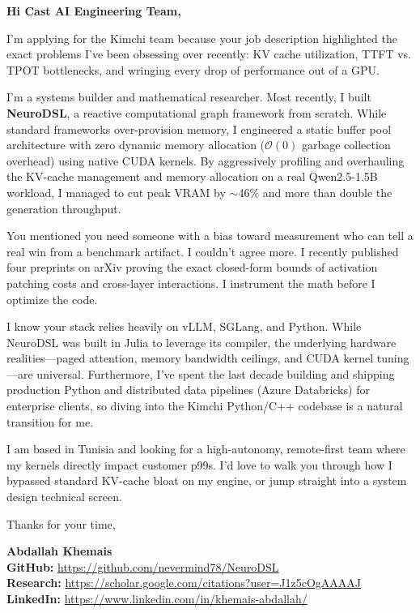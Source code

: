 \documentclass[11pt,a4paper]{article}
\begin{document}
\thispagestyle{empty} 

\textbf{Hi Cast AI Engineering Team,}

I’m applying for the Kimchi team because your job description highlighted the exact problems I’ve been obsessing over recently: KV cache utilization, TTFT vs. TPOT bottlenecks, and wringing every drop of performance out of a GPU. 

I’m a systems builder and mathematical researcher. Most recently, I built \textbf{NeuroDSL}, a reactive computational graph framework from scratch. While standard frameworks over-provision memory, I engineered a static buffer pool architecture with zero dynamic memory allocation ($\mathcal{O}(0)$ garbage collection overhead) using native CUDA kernels. By aggressively profiling and overhauling the KV-cache management and memory allocation on a real Qwen2.5-1.5B workload, I managed to cut peak VRAM by $\sim$46\% and more than double the generation throughput. 

You mentioned you need someone with a bias toward measurement who can tell a real win from a benchmark artifact. I couldn't agree more. I recently published four preprints on arXiv proving the exact closed-form bounds of activation patching costs and cross-layer interactions. I instrument the math before I optimize the code. 

I know your stack relies heavily on vLLM, SGLang, and Python. While NeuroDSL was built in Julia to leverage its compiler, the underlying hardware realities---paged attention, memory bandwidth ceilings, and CUDA kernel tuning---are universal. Furthermore, I’ve spent the last decade building and shipping production Python and distributed data pipelines (Azure Databricks) for enterprise clients, so diving into the Kimchi Python/C++ codebase is a natural transition for me.

I am based in Tunisia and looking for a high-autonomy, remote-first team where my kernels directly impact customer p99s. I’d love to walk you through how I bypassed standard KV-cache bloat on my engine, or jump straight into a system design technical screen.

Thanks for your time,

\vspace{1.5em}
\textbf{Abdallah Khemais} \\
\textbf{GitHub:} \url{https://github.com/nevermind78/NeuroDSL} \\
\textbf{Research:} \url{https://scholar.google.com/citations?user=J1z5cOgAAAAJ} \\
\textbf{LinkedIn:} \url{https://www.linkedin.com/in/khemais-abdallah/}
\end{document}
